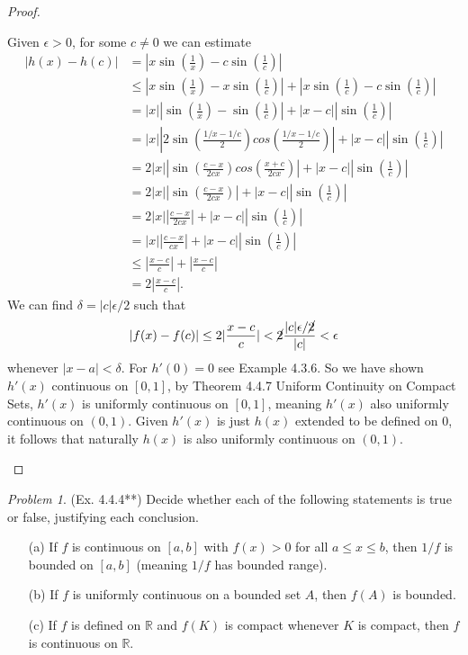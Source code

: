 \documentclass[11pt,twoside, reqno]{amsart}
\theoremstyle{remark}
\newtheorem{Prob}{Problem}
\def\R{\mathbb R}
\begin{document}
\begin{proof}
\begin{enumerate}
    Given $\epsilon > 0$, for some $c \neq 0$ we can estimate
    \begin{align*}
        |h(x) - h(c)| &= |x\sin(\frac{1}{x}) - c\sin(\frac{1}{c})| \\
        &\leq |x\sin(\frac{1}{x}) - x\sin(\frac{1}{c})| + |x\sin(\frac{1}{c}) - c\sin(\frac{1}{c})| \\
        &= |x||\sin(\frac{1}{x}) - \sin(\frac{1}{c})| + |x - c||\sin(\frac{1}{c})| \\
        &= |x||2\sin(\frac{1/x - 1/c}{2})cos(\frac{1/x - 1/c}{2})| + |x - c||\sin(\frac{1}{c})| \\
        &= 2|x||\sin(\frac{c - x}{2cx})cos(\frac{x + c}{2cx})| + |x - c||\sin(\frac{1}{c})| \\
        &= 2|x||\sin(\frac{c - x}{2cx})| + |x - c||\sin(\frac{1}{c})| \\
        &= 2|x||\frac{c-x}{2cx}| + |x - c||\sin(\frac{1}{c})| \\
        &= |x||\frac{c-x}{cx}| + |x - c||\sin(\frac{1}{c})| \\
        &\leq |\frac{x - c}{c}| + |\frac{x - c}{c}| \\
        &= 2|\frac{x - c}{c}|.
    \end{align*}
    We can find $\delta = |c|\epsilon / 2$ such that
    $$
        |f(x) - f(c)| \leq 2|\frac{x - c}{c}| < \cancel{2} \frac{|c|\epsilon / \cancel{2}}{|c|}< \epsilon
    $$
    whenever $|x - a| < \delta$. For $h'(0) = 0$ see Example 4.3.6. So we have shown $h'(x)$ continuous on $[0,1]$, by Theorem 4.4.7 Uniform Continuity on Compact Sets, $h'(x)$ is uniformly continuous on $[0,1]$, meaning $h'(x)$ also uniformly continuous on $(0,1)$. Given $h'(x)$ is just $h(x)$ extended to be defined on $0$, it follows that naturally $h(x)$ is also uniformly continuous on $(0,1)$.
\end{enumerate}

\end{proof}

\begin{Prob}(Ex. 4.4.4**) Decide whether each of the following statements is true or false, justifying each conclusion.
\begin{enumerate}
    \item [(a)] If $f$ is continuous on $[a,b]$ with $f(x) > 0$ for all $a \leq x \leq b$, then $1/f$ is bounded on $[a,b]$ (meaning $1/f$ has bounded range).
    \item [(b)] If $f$ is uniformly continuous on a bounded set $A$, then $f(A)$ is bounded.
    \item [(c)] If $f$ is defined on $\R$ and $f(K)$ is compact whenever $K$ is compact, then $f$ is continuous on $\R$.
\end{enumerate}
\end{Prob}
\end{document}
